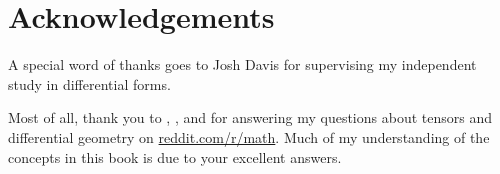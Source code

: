 \section*{Acknowledgements}

A special word of thanks goes to Josh Davis for supervising my independent study in differential forms.

Most of all, thank you to , , and  for answering my questions about tensors and differential geometry on \url{reddit.com/r/math}. Much of my understanding of the concepts in this book is due to your excellent answers.

\mbox{}\\
